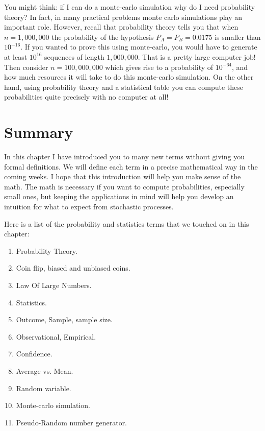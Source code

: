 You might think: if I can do a monte-carlo simulation why do I need
probability theory? In fact, in many practical problems monte carlo
simulations play an important role. However, recall that probability
theory tells you that when $n=1,000,000$ the probability of the
hypothesis $P_A=P_B=0.0175$ is smaller than $10^{-16}$. If you wanted
to prove this using monte-carlo, you would have to generate at least
$10^{16}$ sequences of length $1,000,000$. That is a pretty large
computer job! Then consider $n=100,000,000$ which gives rise to a
probability of $10^{-64}$, and how much resources it will take to do
this monte-carlo simulation. On the other hand, using probability
theory and a statistical table you can compute these probabilities
quite precisely with no computer at all!


\section{Summary}

In this chapter I have introduced you to many new terms without giving
you formal definitions. We will define each term in a precise
mathematical way in the coming weeks. I hope that this introduction
will help you make sense of the math. The math is necessary if you
want to compute probabilities, especially small ones, but keeping the
applications in mind will help you develop an intuition for what to
expect from stochastic processes.

Here is a list of the probability and statistics terms that we touched
on in this chapter:
\begin{enumerate}
\item Probability Theory.
\item Coin flip, biased and unbiased coins.
\item Law Of Large Numbers.
\item Statistics.
\item Outcome, Sample, sample size.
\item Observational, Empirical.
\item Confidence.
\item Average vs. Mean.
\item Random variable.
\item Monte-carlo simulation.
\item Pseudo-Random number generator.
\end{enumerate}



